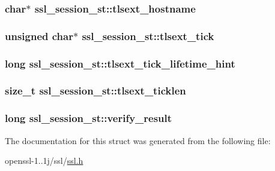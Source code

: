 \hypertarget{structssl__session__st_a693a87dae0162e6460ab909deeb865f0}{
\subsubsection[{tlsext\-\_\-hostname}]{\setlength{\rightskip}{0pt plus 5cm}char$\ast$ ssl\-\_\-session\-\_\-st\-::tlsext\-\_\-hostname}}\label{structssl__session__st_a693a87dae0162e6460ab909deeb865f0}
\hypertarget{structssl__session__st_a061e6eca821a577ac647c1990ad8abb4}{
\subsubsection[{tlsext\-\_\-tick}]{\setlength{\rightskip}{0pt plus 5cm}unsigned char$\ast$ ssl\-\_\-session\-\_\-st\-::tlsext\-\_\-tick}}\label{structssl__session__st_a061e6eca821a577ac647c1990ad8abb4}
\hypertarget{structssl__session__st_a8c4421410ed55e716ab61e143f636f24}{
\subsubsection[{tlsext\-\_\-tick\-\_\-lifetime\-\_\-hint}]{\setlength{\rightskip}{0pt plus 5cm}long ssl\-\_\-session\-\_\-st\-::tlsext\-\_\-tick\-\_\-lifetime\-\_\-hint}}\label{structssl__session__st_a8c4421410ed55e716ab61e143f636f24}
\hypertarget{structssl__session__st_a8858f901b65590fa8a077c2ef6f8aef1}{
\subsubsection[{tlsext\-\_\-ticklen}]{\setlength{\rightskip}{0pt plus 5cm}size\-\_\-t ssl\-\_\-session\-\_\-st\-::tlsext\-\_\-ticklen}}\label{structssl__session__st_a8858f901b65590fa8a077c2ef6f8aef1}
\hypertarget{structssl__session__st_a448769f219815a3a49b726d5ab288783}{
\subsubsection[{verify\-\_\-result}]{\setlength{\rightskip}{0pt plus 5cm}long ssl\-\_\-session\-\_\-st\-::verify\-\_\-result}}\label{structssl__session__st_a448769f219815a3a49b726d5ab288783}


The documentation for this struct was generated from the following file\-:\begin{DoxyCompactItemize}
\item 
openssl-\/1..\-1j/ssl/\hyperlink{ssl_8h}{ssl.\-h}\end{DoxyCompactItemize}
